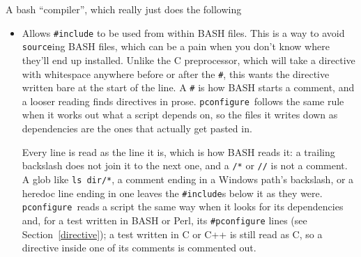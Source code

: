 \documentclass{article}
\newcommand{\pconfigure}{\texttt{pconfigure}}
\begin{document}
A bash ``compiler'', which really just does the following
\begin{itemize}
\item Allows \texttt{\#include} to be used from within BASH files.
  This is a way to avoid \texttt{source}ing BASH files, which can be a
  pain when you don't know where they'll end up installed.  Unlike the
  C preprocessor, which will take a directive with whitespace anywhere
  before or after the \texttt{\#}, this wants the directive written
  bare at the start of the line.  A \texttt{\#} is how BASH starts a
  comment, and a looser reading finds directives in prose.
  \pconfigure\ follows the same rule when it works out what a script
  depends on, so the files it writes down as dependencies are the ones
  that actually get pasted in.

  Every line is read as the line it is, which is how BASH reads it:
  a trailing backslash does not join it to the next one, and a
  \texttt{/*} or \texttt{//} is not a comment.  A glob like
  \texttt{ls dir/*}, a comment ending in a Windows path's backslash,
  or a heredoc line ending in one leaves the \texttt{\#include}s
  below it as they were.  \pconfigure\ reads a script the same way
  when it looks for its dependencies and, for a test written in BASH
  or Perl, its \texttt{\#pconfigure} lines (see
  Section~\ref{directive}); a test written in C or C++ is still read
  as C, so a directive inside one of its comments is commented out.


\end{itemize}
\end{document}
